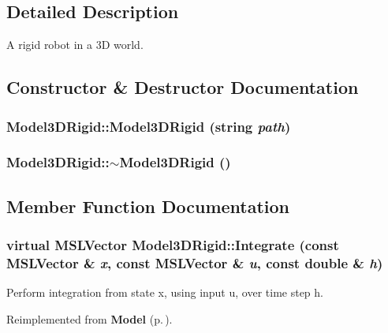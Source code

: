 \subsection{Detailed Description}
A rigid robot in a 3D world.



\subsection{Constructor \& Destructor Documentation}
\subsubsection{\setlength{\rightskip}{0pt plus 5cm}Model3DRigid::Model3DRigid (string {\em path})}\label{class_Model3DRigid_a0}


\subsubsection{\setlength{\rightskip}{0pt plus 5cm}Model3DRigid::$\sim$Model3DRigid ()\hspace{0.3cm}{\tt  [inline, virtual]}}\label{class_Model3DRigid_a1}




\subsection{Member Function Documentation}
\subsubsection{\setlength{\rightskip}{0pt plus 5cm}virtual {\bf MSLVector} Model3DRigid::Integrate (const {\bf MSLVector} \& {\em x}, const {\bf MSLVector} \& {\em u}, const double \& {\em h})\hspace{0.3cm}{\tt  [virtual]}}\label{class_Model3DRigid_a2}


Perform integration from state x, using input u, over time step h.



Reimplemented from {\bf Model} {\rm (p.\,\pageref{class_Model_a5})}.

